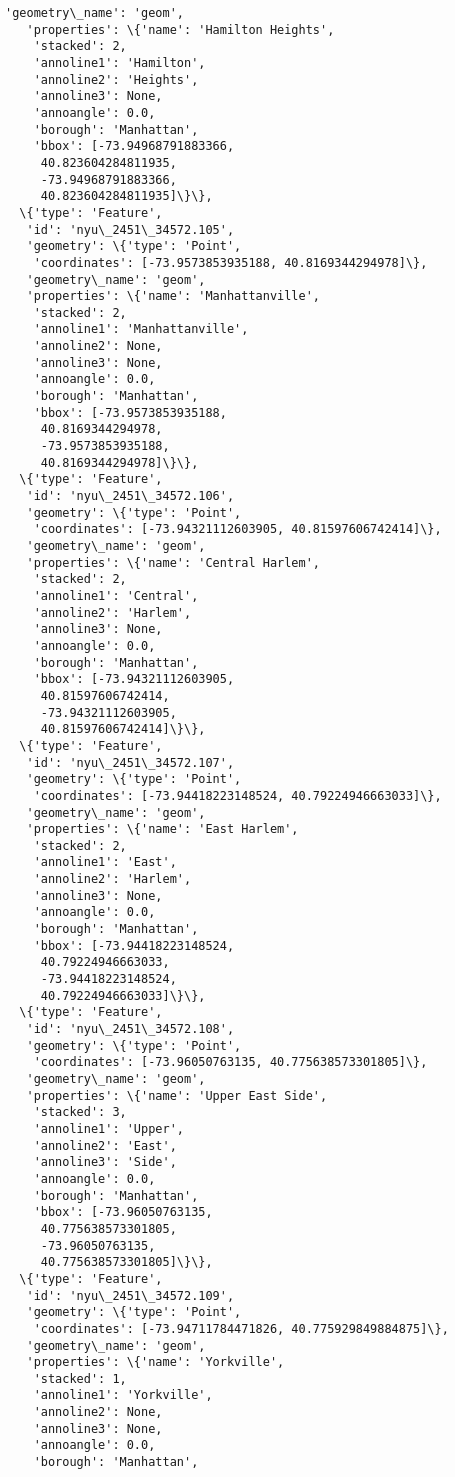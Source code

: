 \documentclass[11pt]{article}
\begin{document}
\begin{tcolorbox}[breakable, size=fbox, boxrule=.5pt, pad at break*=1mm, opacityfill=0]
\begin{Verbatim}[commandchars=\\\{\}]
   'geometry\_name': 'geom',
   'properties': \{'name': 'Hamilton Heights',
    'stacked': 2,
    'annoline1': 'Hamilton',
    'annoline2': 'Heights',
    'annoline3': None,
    'annoangle': 0.0,
    'borough': 'Manhattan',
    'bbox': [-73.94968791883366,
     40.823604284811935,
     -73.94968791883366,
     40.823604284811935]\}\},
  \{'type': 'Feature',
   'id': 'nyu\_2451\_34572.105',
   'geometry': \{'type': 'Point',
    'coordinates': [-73.9573853935188, 40.8169344294978]\},
   'geometry\_name': 'geom',
   'properties': \{'name': 'Manhattanville',
    'stacked': 2,
    'annoline1': 'Manhattanville',
    'annoline2': None,
    'annoline3': None,
    'annoangle': 0.0,
    'borough': 'Manhattan',
    'bbox': [-73.9573853935188,
     40.8169344294978,
     -73.9573853935188,
     40.8169344294978]\}\},
  \{'type': 'Feature',
   'id': 'nyu\_2451\_34572.106',
   'geometry': \{'type': 'Point',
    'coordinates': [-73.94321112603905, 40.81597606742414]\},
   'geometry\_name': 'geom',
   'properties': \{'name': 'Central Harlem',
    'stacked': 2,
    'annoline1': 'Central',
    'annoline2': 'Harlem',
    'annoline3': None,
    'annoangle': 0.0,
    'borough': 'Manhattan',
    'bbox': [-73.94321112603905,
     40.81597606742414,
     -73.94321112603905,
     40.81597606742414]\}\},
  \{'type': 'Feature',
   'id': 'nyu\_2451\_34572.107',
   'geometry': \{'type': 'Point',
    'coordinates': [-73.94418223148524, 40.79224946663033]\},
   'geometry\_name': 'geom',
   'properties': \{'name': 'East Harlem',
    'stacked': 2,
    'annoline1': 'East',
    'annoline2': 'Harlem',
    'annoline3': None,
    'annoangle': 0.0,
    'borough': 'Manhattan',
    'bbox': [-73.94418223148524,
     40.79224946663033,
     -73.94418223148524,
     40.79224946663033]\}\},
  \{'type': 'Feature',
   'id': 'nyu\_2451\_34572.108',
   'geometry': \{'type': 'Point',
    'coordinates': [-73.96050763135, 40.775638573301805]\},
   'geometry\_name': 'geom',
   'properties': \{'name': 'Upper East Side',
    'stacked': 3,
    'annoline1': 'Upper',
    'annoline2': 'East',
    'annoline3': 'Side',
    'annoangle': 0.0,
    'borough': 'Manhattan',
    'bbox': [-73.96050763135,
     40.775638573301805,
     -73.96050763135,
     40.775638573301805]\}\},
  \{'type': 'Feature',
   'id': 'nyu\_2451\_34572.109',
   'geometry': \{'type': 'Point',
    'coordinates': [-73.94711784471826, 40.775929849884875]\},
   'geometry\_name': 'geom',
   'properties': \{'name': 'Yorkville',
    'stacked': 1,
    'annoline1': 'Yorkville',
    'annoline2': None,
    'annoline3': None,
    'annoangle': 0.0,
    'borough': 'Manhattan',

\end{Verbatim}
\end{tcolorbox}
\end{document}
